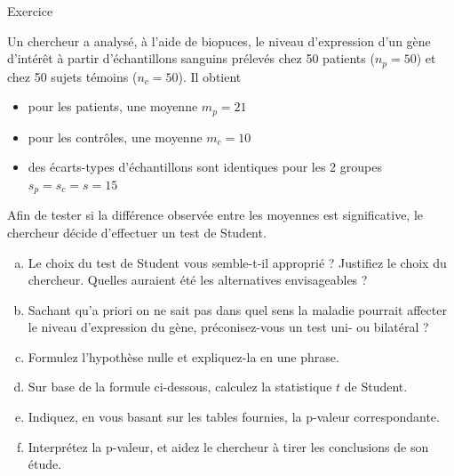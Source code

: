 \documentclass[ignorenonframetext,]{beamer}
\providecommand{\tightlist}{%
  \setlength{\itemsep}{0pt}\setlength{\parskip}{0pt}}
\begin{document}
\begin{frame}{Exercice}
\protect\hypertarget{exercice}{}

Un chercheur a analysé, à l'aide de biopuces, le niveau d'expression
d'un gène d'intérêt à partir d'échantillons sanguins prélevés chez 50
patients (\(n_p=50\)) et chez 50 sujets témoins (\(n_c=50\)). Il obtient

\begin{itemize}
\tightlist
\item
  pour les patients, une moyenne \(m_p= 21\)
\item
  pour les contrôles, une moyenne \(m_c= 10\)
\item
  des écarts-types d'échantillons sont identiques pour les 2 groupes
  \(s_p = s_c = s = 15\)
\end{itemize}

Afin de tester si la différence observée entre les moyennes est
significative, le chercheur décide d'effectuer un test de Student.

\begin{enumerate}
[a.]
\item
  Le choix du test de Student vous semble-t-il approprié ? Justifiez le
  choix du chercheur. Quelles auraient été les alternatives
  envisageables ?
\item
  Sachant qu'a priori on ne sait pas dans quel sens la maladie pourrait
  affecter le niveau d'expression du gène, préconisez-vous un test uni-
  ou bilatéral ?
\item
  Formulez l'hypothèse nulle et expliquez-la en une phrase.
\item
  Sur base de la formule ci-dessous, calculez la statistique \(t\) de
  Student.
\item
  Indiquez, en vous basant sur les tables fournies, la p-valeur
  correspondante.
\item
  Interprétez la p-valeur, et aidez le chercheur à tirer les conclusions
  de son étude.
\end{enumerate}

\end{frame}
\end{document}
